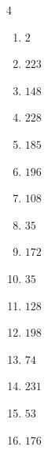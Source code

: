 \begin{multicols}{4}
\begin{enumerate}
  \item $2$


\columnbreak %

  \item $223$


  \item $148$


  \item $228$


  \item $185$


  \item $196$


  \item $108$


  \item $35$


  \item $172$


  \item $35$


  \item $128$


  \item $198$


  \item $74$


  \item $231$


  \item $53$


  \item $176$


\end{enumerate}
\end{multicols}
